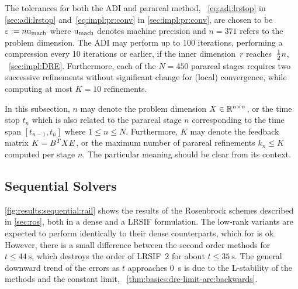 The tolerances for both the \ac{ADI} and parareal method,
\cf~\eqref{eq:adi:lrstop} in \autoref{sec:adi:lrstop}
and~\eqref{eq:impl:pr:conv} in \autoref{sec:impl:pr:conv},
are chosen to be $\varepsilon := n\mathrm u_\text{mach}$
where $\mathrm u_\text{mach}$ denotes machine precision
and $n=371$ refers to the problem dimension.
The \ac{ADI} may perform up to 100 iterations,
performing a compression every 10 iterations or earlier,
if the inner dimension~$r$ reaches~$\tfrac{1}{2} n$,
\cf~\autoref{sec:impl:DRE}.
Furthermore, each of the $N = 450$ parareal stages requires two successive refinements without significant change
for (local) convergence,
while computing at most $K = 10$ refinements.

\begin{remark}
  In this subsection,
  $n$ may denote the problem dimension $X \in\mathbb{R}^{n\times n}$,
  or the time stop $t_n$
  which is also related to the parareal stage $n$ corresponding to the time span $[t_{n-1}, t_n]$
  where $1 \leq n \leq N$.
  Furthermore,
  $K$ may denote the feedback matrix \mbox{$K = B^T X E$},
  or the maximum number of parareal refinements $k_n \leq K$ computed per stage $n$.
  The particular meaning should be clear from its context.
\end{remark}

\subsection{Sequential Solvers}

\autoref{fig:results:sequential:rail} shows the results of the Rosenbrock schemes described in \autoref{sec:ros},
both in a dense and a \ac{LRSIF} formulation.
The low-rank variants are expected to perform identically to their dense counterparts,
which for  is ok.
However, there is a small difference between the second order methods for $t\leq\SI{44}{\second}$,
which destroys the order of \ac{LRSIF}~2 for about $t\leq\SI{35}{\second}$.
The general downward trend of the errors as $t$ approaches \SI{0}{\second} is due to the L-stability of the methods and the constant limit,
\cf~\autoref{thm:basics:dre-limit-are:backwards}.

